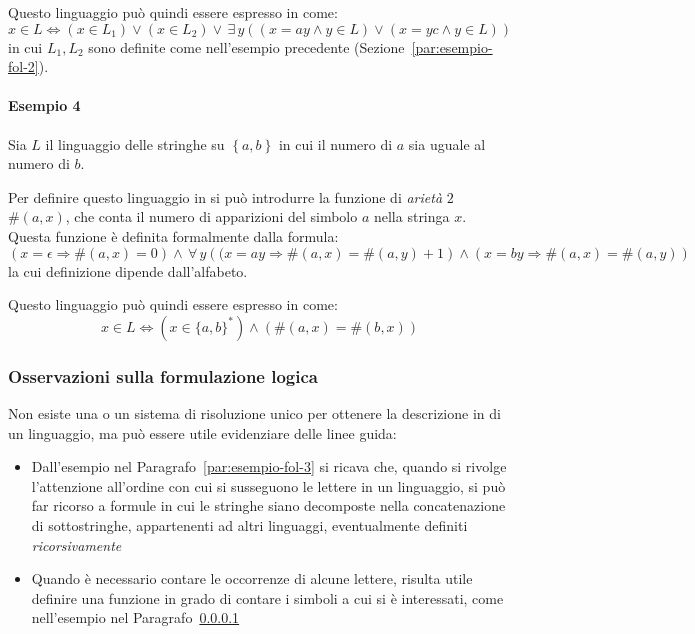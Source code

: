\documentclass[italian, 10pt]{article}
\begin{document}
Questo linguaggio può quindi essere espresso in \FOL come:
\[ x \in L \Leftrightarrow (x \in L_1) \lor (x \in L_2) \lor \, \exists \, y \left((x = ay \land y \in L) \lor (x = yc \land y \in L)\right) \]
in cui \(L_1, L_2\) sono definite come nell'esempio precedente (Sezione~\ref{par:esempio-fol-2}).

\paragraph{Esempio 4}
\label{par:esempio-fol-4}

Sia \(L\) il linguaggio delle stringhe su \(\left\{ a, b \right\}\) in cui il numero di \(a\) sia uguale al numero di \(b\).

Per definire questo linguaggio in \FOL si può introdurre la funzione di \textit{arietà} \(2\) \(\#(a, x)\), che conta il numero di apparizioni del simbolo \(a\) nella stringa \(x\).
Questa funzione è definita formalmente dalla formula:
\[ \left(x = \epsilon \Rightarrow \#(a, x) = 0 \right) \land \, \forall \, y \left((x = ay \Rightarrow \#(a, x) = \#(a, y) + 1\right) \land \left(x =  b y \Rightarrow \#(a, x) = \#(a, y) \right) \]
la cui definizione dipende dall'alfabeto.

\bigskip
Questo linguaggio può quindi essere espresso in \FOL come:
\[ x \in L \Leftrightarrow (x \in \{a, b\}^\ast) \land (\#(a, x) = \#(b, x)) \]

\subsubsection{Osservazioni sulla formulazione logica}

Non esiste una  o un sistema di risoluzione unico per ottenere la descrizione in \FOL di un linguaggio, ma può essere utile evidenziare delle linee guida:

\begin{itemize}
  \item Dall'esempio nel Paragrafo~\ref{par:esempio-fol-3} si ricava che, quando si rivolge l'attenzione all'ordine con cui si susseguono le lettere in un linguaggio, si può far ricorso a formule in cui le stringhe siano decomposte nella concatenazione di sottostringhe, appartenenti ad altri linguaggi, eventualmente definiti \textit{ricorsivamente}
  \item Quando è necessario contare le occorrenze di alcune lettere, risulta utile definire una funzione in grado di contare i simboli a cui si è interessati, come nell'esempio nel Paragrafo~\ref{par:esempio-fol-4}
\end{itemize}
\end{document}
